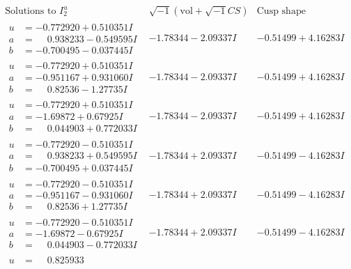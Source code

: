 \documentclass[1p]{elsarticle_modified}
\theoremstyle{definition}
\newcommand{\I}{\sqrt{-1}}
\begin{document}
$$\begin{array}{c|c|c}  
\text{Solutions to }I^u_{2}& \I (\text{vol} + \sqrt{-1}CS) & \text{Cusp shape}\\
 \hline 
\begin{aligned}
u &= -0.772920 + 0.510351 I \\
a &= \phantom{-}0.938233 - 0.549595 I \\
b &= -0.700495 - 0.037445 I\end{aligned}
 & -1.78344 - 2.09337 I & -0.51499 + 4.16283 I \\ \hline\begin{aligned}
u &= -0.772920 + 0.510351 I \\
a &= -0.951167 + 0.931060 I \\
b &= \phantom{-}0.82536 - 1.27735 I\end{aligned}
 & -1.78344 - 2.09337 I & -0.51499 + 4.16283 I \\ \hline\begin{aligned}
u &= -0.772920 + 0.510351 I \\
a &= -1.69872 + 0.67925 I \\
b &= \phantom{-}0.044903 + 0.772033 I\end{aligned}
 & -1.78344 - 2.09337 I & -0.51499 + 4.16283 I \\ \hline\begin{aligned}
u &= -0.772920 - 0.510351 I \\
a &= \phantom{-}0.938233 + 0.549595 I \\
b &= -0.700495 + 0.037445 I\end{aligned}
 & -1.78344 + 2.09337 I & -0.51499 - 4.16283 I \\ \hline\begin{aligned}
u &= -0.772920 - 0.510351 I \\
a &= -0.951167 - 0.931060 I \\
b &= \phantom{-}0.82536 + 1.27735 I\end{aligned}
 & -1.78344 + 2.09337 I & -0.51499 - 4.16283 I \\ \hline\begin{aligned}
u &= -0.772920 - 0.510351 I \\
a &= -1.69872 - 0.67925 I \\
b &= \phantom{-}0.044903 - 0.772033 I\end{aligned}
 & -1.78344 + 2.09337 I & -0.51499 - 4.16283 I \\ \hline\begin{aligned}
u &= \phantom{-}0.825933\phantom{ +0.000000I} \\

\end{aligned}
\end{array}$$
\end{document}
